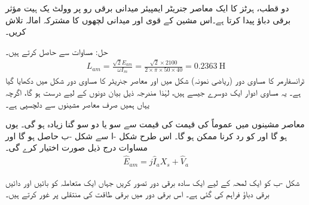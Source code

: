 دو قطب،  ہرٹز کا ایک معاصر جنریٹر  ایمپیئر میدانی برقی رو پر   وولٹ یک ہیت مؤثر برقی دباؤ پیدا کرتا ہے۔اس مشین کے قوی اور میدانی لچھوں کا مشترکہ امالہ تلاش کریں۔

حل:\quad
	مساوات   سے   حاصل کرتے ہیں۔
\begin{align}
L_{am}=\frac{\sqrt{2} E_{am}}{\omega I_m}=\frac{\sqrt{2}  \times 2100}{2 \times \pi \times 50 \times 40}=\SI{0.2363}{\henry}
\end{align}
%
ٹرانسفارمر کا مساوی دور (ریاضی نمونہ) شکل   میں  اور معاصر جنریٹر کا مساوی دور  شکل  میں دکھایا گیا ہے۔ یہ مساوی ادوار ایک دوسرے جیسے  ہیں، لہٰذا مندرجہ ذیل بیان دونوں کے لیے درست ہو گا، اگرچہ یہاں ہمیں صرف معاصر مشینوں سے دلچسپی ہے۔

معاصر مشینوں میں عموماً  کی قیمت   کی قیمت سے  سو یا دو سو گنا زیادہ ہو گی۔ یوں  ہو گا اور  کو رد کرنا ممکن ہو گا۔ اس طرح  شکل -ا سے شکل -ب حاصل ہو گا اور مساوات  درج ذیل صورت اختیار کرے گی۔
\begin{align}\label{مساوات_معاصر_جنریٹر_دوری_سمتیہ_مساوات_سادہ}
\hat{E}_{am}= j \hat{I}_a X_s +\hat{V}_a
\end{align}

شکل -ب کو  ایک لمحہ کے لیے ایک سادہ برقی دور تصور کریں جہاں  ایک متعاملہ   کو بائیں   اور دائیں   برقی دباؤ فراہم کی گئی ہے۔ اس برقی دور میں برقی طاقت کی منتقلی پر غور کرتے ہیں۔

